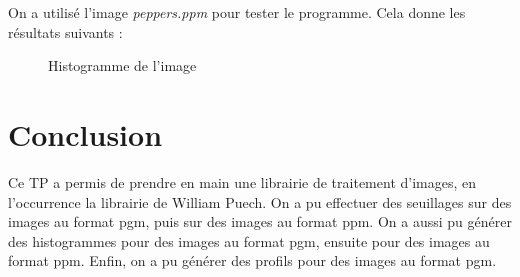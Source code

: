 \documentclass[french,a4paper,10pt]{article}
\begin{document}
	On a utilis\'e l'image \emph{peppers.ppm} pour tester le programme. Cela donne les r\'esultats suivants :
	\begin{figure}[!htb]
		\begin{minipage}{0.48\textwidth}
			\centering
			\caption{Donn\'ees de l'histogramme}\label{Fig:histo-couleur-data}
		\end{minipage}\hfill
		\begin{minipage}{0.48\textwidth}
			\centering
			\caption{Histogramme de l'image}\label{Fig:histo-couleur-plot}
		\end{minipage}
	\end{figure}

	\newpage
	\section{Conclusion}\label{sec:7}
	Ce TP a permis de prendre en main une librairie de traitement d'images, en l'occurrence la librairie de William
	Puech.
	On a pu effectuer des seuillages sur des images au format pgm, puis sur des images au format ppm.
	On a aussi pu g\'en\'erer des histogrammes pour des images au format pgm, ensuite pour des images au format ppm.
	Enfin, on a pu g\'en\'erer des profils pour des images au format pgm.
\end{document}
